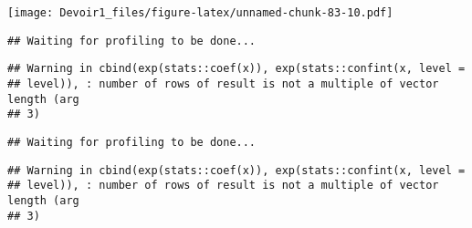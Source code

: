 \documentclass[]{article}
\newenvironment{Shaded}{\begin{snugshade}}{\end{snugshade}}
\newcommand{\KeywordTok}[1]{\textcolor[rgb]{0.13,0.29,0.53}{\textbf{#1}}}
\newcommand{\DataTypeTok}[1]{\textcolor[rgb]{0.13,0.29,0.53}{#1}}
\newcommand{\DecValTok}[1]{\textcolor[rgb]{0.00,0.00,0.81}{#1}}
\newcommand{\StringTok}[1]{\textcolor[rgb]{0.31,0.60,0.02}{#1}}
\newcommand{\OperatorTok}[1]{\textcolor[rgb]{0.81,0.36,0.00}{\textbf{#1}}}
\newcommand{\NormalTok}[1]{#1}
\begin{document}
\texttt{[image: Devoir1\_files/figure-latex/unnamed-chunk-83-10.pdf]}

\begin{Shaded}
\end{Shaded}

\begin{verbatim}
## Waiting for profiling to be done...
\end{verbatim}

\begin{verbatim}
## Warning in cbind(exp(stats::coef(x)), exp(stats::confint(x, level =
## level)), : number of rows of result is not a multiple of vector length (arg
## 3)
\end{verbatim}

\begin{verbatim}
## Waiting for profiling to be done...
\end{verbatim}

\begin{verbatim}
## Warning in cbind(exp(stats::coef(x)), exp(stats::confint(x, level =
## level)), : number of rows of result is not a multiple of vector length (arg
## 3)
\end{verbatim}
\end{document}
